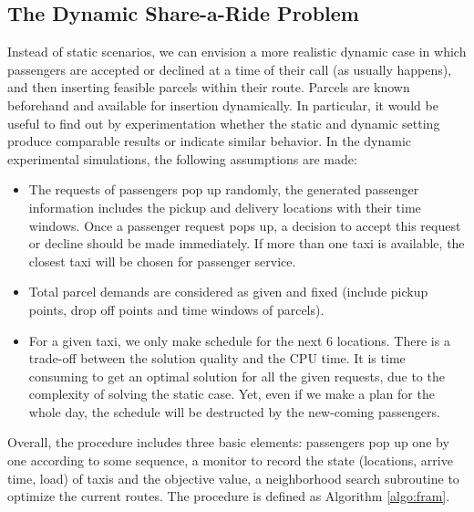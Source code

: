 \documentclass[preprint,authoryear,12pt]{elsarticle}
\begin{document}
\subsection{The Dynamic Share-a-Ride Problem}
\label{sec_dynamic}

Instead of static scenarios, we can envision a more realistic dynamic case in which passengers are accepted or declined at a time of their call (as usually happens), and then inserting feasible parcels within their route. Parcels are known beforehand and available for insertion dynamically. In particular, it would be useful to find out by experimentation whether the static and dynamic setting produce comparable results or indicate similar behavior. In the dynamic experimental simulations, the following assumptions are made:

\begin{itemize}
\item The requests of passengers pop up randomly, the generated passenger information includes the pickup and delivery locations with their time windows. Once a passenger request pops up, a decision to accept this request or decline should be made immediately. If more than one taxi is available, the closest taxi will be chosen for passenger service.
\item Total parcel demands are considered as given and fixed (include  pickup points, drop off points and time windows of parcels).
\item For a given taxi, we only make schedule for the next 6 locations. There is a trade-off between the solution quality and the CPU time. It is time consuming to get an optimal solution for all the given requests, due to the complexity of solving the static case. Yet, even if we make a plan for the whole day, the schedule will be destructed by the new-coming passengers. 
\end{itemize}

Overall, the procedure includes three basic elements: passengers pop up one by one according to some sequence, a monitor to record the state (locations, arrive time, load) of taxis and the objective value, a neighborhood search subroutine to optimize the current routes. The procedure is defined as Algorithm \ref{algo:fram}.
\end{document}
